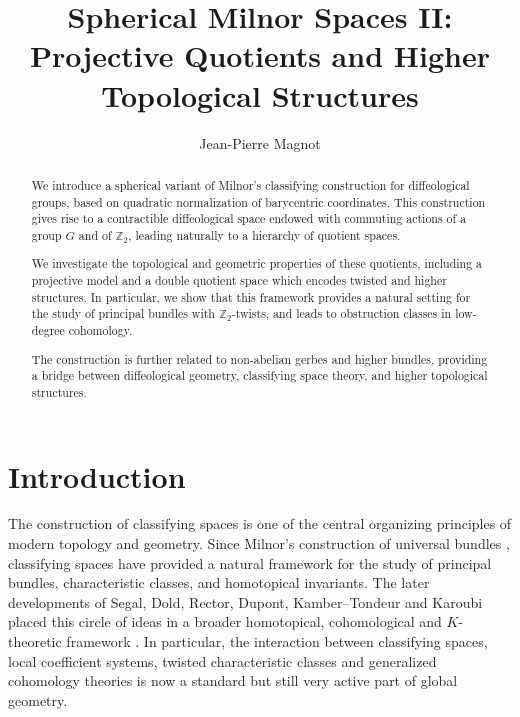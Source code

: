 \documentclass[11pt]{amsart}
\title[Spherical Milnor Spaces and Topological Structures]{
Spherical Milnor Spaces II: Projective Quotients and Higher Topological Structures
}
\author{Jean-Pierre Magnot}
\begin{document}
\begin{abstract}
We introduce a spherical variant of Milnor's classifying construction for diffeological groups, based on quadratic normalization of barycentric coordinates. This construction gives rise to a contractible diffeological space endowed with commuting actions of a group $G$ and of $\mathbb{Z}_2$, leading naturally to a hierarchy of quotient spaces.

We investigate the topological and geometric properties of these quotients, including a projective model and a double quotient space which encodes twisted and higher structures. In particular, we show that this framework provides a natural setting for the study of principal bundles with $\mathbb{Z}_2$-twists, and leads to obstruction classes in low-degree cohomology.

The construction is further related to non-abelian gerbes and higher bundles, providing a bridge between diffeological geometry, classifying space theory, and higher topological structures.
\end{abstract}

\maketitle
\tableofcontents
\section{Introduction}

The construction of classifying spaces is one of the central organizing
principles of modern topology and geometry. Since Milnor's construction of
universal bundles \cite{Milnor1956I,Milnor1956II}, classifying spaces have
provided a natural framework for the study of principal bundles,
characteristic classes, and homotopical invariants. The later developments of
Segal, Dold, Rector, Dupont, Kamber--Tondeur and Karoubi placed this circle of
ideas in a broader homotopical, cohomological and \(K\)-theoretic framework
\cite{Segal1968,Dold1963,Rector1971,Dupont1978,KamberTondeur1975,Karoubi1978}.
In particular, the interaction between classifying spaces, local coefficient
systems, twisted characteristic classes and generalized cohomology theories is
now a standard but still very active part of global geometry.
\end{document}
